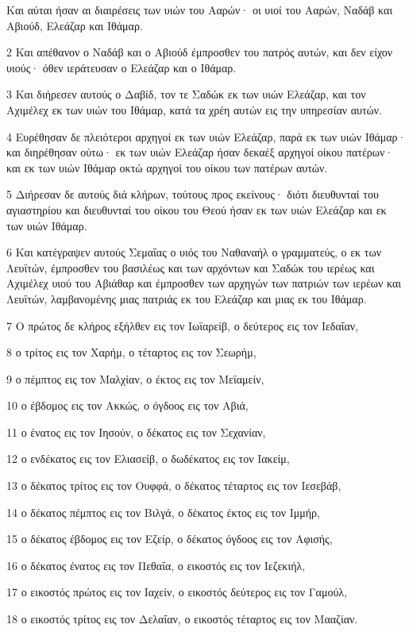 \par Και αύται ήσαν αι διαιρέσεις των υιών του Ααρών· οι υιοί του Ααρών, Ναδάβ και Αβιούδ, Ελεάζαρ και Ιθάμαρ.
\par 2 Και απέθανον ο Ναδάβ και ο Αβιούδ έμπροσθεν του πατρός αυτών, και δεν είχον υιούς· όθεν ιεράτευσαν ο Ελεάζαρ και ο Ιθάμαρ.
\par 3 Και διήρεσεν αυτούς ο Δαβίδ, τον τε Σαδώκ εκ των υιών Ελεάζαρ, και τον Αχιμέλεχ εκ των υιών του Ιθάμαρ, κατά τα χρέη αυτών εις την υπηρεσίαν αυτών.
\par 4 Ευρέθησαν δε πλειότεροι αρχηγοί εκ των υιών Ελεάζαρ, παρά εκ των υιών Ιθάμαρ· και διηρέθησαν ούτω· εκ των υιών Ελεάζαρ ήσαν δεκαέξ αρχηγοί οίκου πατέρων· και εκ των υιών Ιθάμαρ οκτώ αρχηγοί του οίκου των πατέρων αυτών.
\par 5 Διήρεσαν δε αυτούς διά κλήρων, τούτους προς εκείνους· διότι διευθυνταί του αγιαστηρίου και διευθυνταί του οίκου του Θεού ήσαν εκ των υιών Ελεάζαρ και εκ των υιών Ιθάμαρ.
\par 6 Και κατέγραψεν αυτούς Σεμαΐας ο υιός του Ναθαναήλ ο γραμματεύς, ο εκ των Λευϊτών, έμπροσθεν του βασιλέως και των αρχόντων και Σαδώκ του ιερέως και Αχιμέλεχ υιού του Αβιάθαρ και έμπροσθεν των αρχηγών των πατριών των ιερέων και Λευϊτών, λαμβανομένης μιας πατριάς εκ του Ελεάζαρ και μιας εκ του Ιθάμαρ.
\par 7 Ο πρώτος δε κλήρος εξήλθεν εις τον Ιωϊαρείβ, ο δεύτερος εις τον Ιεδαΐαν,
\par 8 ο τρίτος εις τον Χαρήμ, ο τέταρτος εις τον Σεωρήμ,
\par 9 ο πέμπτος εις τον Μαλχίαν, ο έκτος εις τον Μεϊαμείν,
\par 10 ο έβδομος εις τον Ακκώς, ο όγδοος εις τον Αβιά,
\par 11 ο ένατος εις τον Ιησούν, ο δέκατος εις τον Σεχανίαν,
\par 12 ο ενδέκατος εις τον Ελιασείβ, ο δωδέκατος εις τον Ιακείμ,
\par 13 ο δέκατος τρίτος εις τον Ουφφά, ο δέκατος τέταρτος εις τον Ιεσεβάβ,
\par 14 ο δέκατος πέμπτος εις τον Βιλγά, ο δέκατος έκτος εις τον Ιμμήρ,
\par 15 ο δέκατος έβδομος εις τον Εζείρ, ο δέκατος όγδοος εις τον Αφισής,
\par 16 ο δέκατος ένατος εις τον Πεθαΐα, ο εικοστός εις τον Ιεζεκιήλ,
\par 17 ο εικοστός πρώτος εις τον Ιαχείν, ο εικοστός δεύτερος εις τον Γαμούλ,
\par 18 ο εικοστός τρίτος εις τον Δελαΐαν, ο εικοστός τέταρτος εις τον Μααζίαν.
